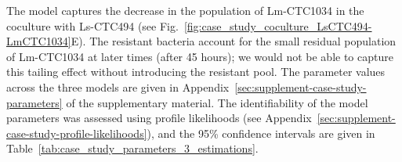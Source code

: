\documentclass[10pt,1p,authoryear]{elsarticle}
\numberwithin{equation}{section}
\begin{document}
The model captures the decrease in the population of Lm-CTC1034 in the coculture with Ls-CTC494 (see Fig.~\ref{fig:case_study_coculture_LsCTC494-LmCTC1034}E).
The resistant bacteria account for the small residual population of Lm-CTC1034 at later times (after 45 hours); we would not be able to capture this tailing effect without introducing the resistant pool. %
The parameter values across the three models are given in Appendix~\ref{sec:supplement-case-study-parameters} of the supplementary material.
The identifiability of the model parameters was assessed using profile likelihoods (see Appendix~\ref{sec:supplement-case-study-profile-likelihoods}), and the 95\% confidence intervals are given in Table~\ref{tab:case_study_parameters_3_estimations}.
%
\end{document}
